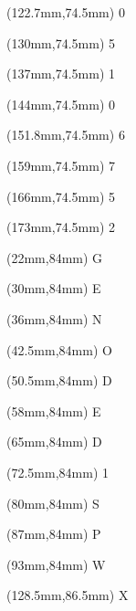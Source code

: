 \begin{textblock*}{74.5mm}(122.7mm,74.5mm)
	{\Large 0}
\end{textblock*}
\begin{textblock*}{74.5mm}(130mm,74.5mm)
	{\Large 5}
\end{textblock*}
\begin{textblock*}{74.5mm}(137mm,74.5mm)
	{\Large 1}
\end{textblock*}
\begin{textblock*}{74.5mm}(144mm,74.5mm)
	{\Large 0}
\end{textblock*}
\begin{textblock*}{74.5mm}(151.8mm,74.5mm)
	{\Large 6}
\end{textblock*}
\begin{textblock*}{74.5mm}(159mm,74.5mm)
	{\Large 7}
\end{textblock*}
\begin{textblock*}{74.5mm}(166mm,74.5mm)
	{\Large 5}
\end{textblock*}
\begin{textblock*}{74.5mm}(173mm,74.5mm)
	{\Large 2}
\end{textblock*}

\begin{textblock*}{80mm}(22mm,84mm)
	{\Large G}
\end{textblock*}
\begin{textblock*}{80mm}(30mm,84mm)
	{\Large E}
\end{textblock*}
\begin{textblock*}{80mm}(36mm,84mm)
	{\Large N}
\end{textblock*}
\begin{textblock*}{80mm}(42.5mm,84mm)
	{\Large O}
\end{textblock*}
\begin{textblock*}{80mm}(50.5mm,84mm)
	{\Large D}
\end{textblock*}
\begin{textblock*}{80mm}(58mm,84mm)
	{\Large E}
\end{textblock*}
\begin{textblock*}{80mm}(65mm,84mm)
	{\Large D}
\end{textblock*}
\begin{textblock*}{80mm}(72.5mm,84mm)
	{\Large 1}
\end{textblock*}
\begin{textblock*}{80mm}(80mm,84mm)
	{\Large S}
\end{textblock*}
\begin{textblock*}{80mm}(87mm,84mm)
	{\Large P}
\end{textblock*}
\begin{textblock*}{80mm}(93mm,84mm)
	{\Large W}
\end{textblock*}
\begin{textblock*}{80mm}(128.5mm,86.5mm)
	{\Large X}
\end{textblock*}
